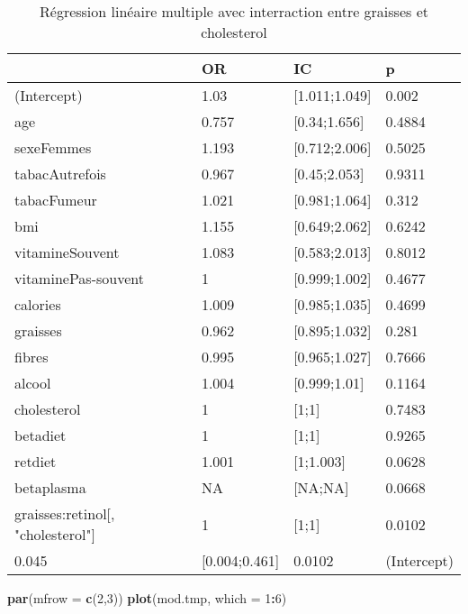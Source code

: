\documentclass[]{article}
\newenvironment{Shaded}{\begin{snugshade}}{\end{snugshade}}
\newcommand{\KeywordTok}[1]{\textcolor[rgb]{0.13,0.29,0.53}{\textbf{#1}}}
\newcommand{\DataTypeTok}[1]{\textcolor[rgb]{0.13,0.29,0.53}{#1}}
\newcommand{\DecValTok}[1]{\textcolor[rgb]{0.00,0.00,0.81}{#1}}
\newcommand{\OperatorTok}[1]{\textcolor[rgb]{0.81,0.36,0.00}{\textbf{#1}}}
\newcommand{\NormalTok}[1]{#1}
\begin{document}
\begin{table}

\caption{\label{tab:unnamed-chunk-89}Régression linéaire multiple avec interraction entre graisses et cholesterol}
\centering
\begin{tabular}[t]{l|l|l|l}
\hline
  & OR & IC & p\\
\hline
\rowcolor[HTML]{BBD2E1}  (Intercept) & 1.03 & [1.011;1.049] & 0.002\\
\hline
age & 0.757 & [0.34;1.656] & 0.4884\\
\hline
\rowcolor[HTML]{BBD2E1}  sexeFemmes & 1.193 & [0.712;2.006] & 0.5025\\
\hline
tabacAutrefois & 0.967 & [0.45;2.053] & 0.9311\\
\hline
\rowcolor[HTML]{BBD2E1}  tabacFumeur & 1.021 & [0.981;1.064] & 0.312\\
\hline
bmi & 1.155 & [0.649;2.062] & 0.6242\\
\hline
\rowcolor[HTML]{BBD2E1}  vitamineSouvent & 1.083 & [0.583;2.013] & 0.8012\\
\hline
vitaminePas-souvent & 1 & [0.999;1.002] & 0.4677\\
\hline
\rowcolor[HTML]{BBD2E1}  calories & 1.009 & [0.985;1.035] & 0.4699\\
\hline
graisses & 0.962 & [0.895;1.032] & 0.281\\
\hline
\rowcolor[HTML]{BBD2E1}  fibres & 0.995 & [0.965;1.027] & 0.7666\\
\hline
alcool & 1.004 & [0.999;1.01] & 0.1164\\
\hline
\rowcolor[HTML]{BBD2E1}  cholesterol & 1 & [1;1] & 0.7483\\
\hline
betadiet & 1 & [1;1] & 0.9265\\
\hline
\rowcolor[HTML]{BBD2E1}  retdiet & 1.001 & [1;1.003] & 0.0628\\
\hline
betaplasma & NA & [NA;NA] & 0.0668\\
\hline
\rowcolor[HTML]{BBD2E1}  graisses:retinol[, "cholesterol"] & 1 & [1;1] & 0.0102\\
\hline
0.045 & [0.004;0.461] & 0.0102 & (Intercept)\\
\hline
\end{tabular}
\end{table}

\begin{Shaded}
\begin{Highlighting}[]
\KeywordTok{par}\NormalTok{(}\DataTypeTok{mfrow =} \KeywordTok{c}\NormalTok{(}\DecValTok{2}\NormalTok{,}\DecValTok{3}\NormalTok{))}
\KeywordTok{plot}\NormalTok{(mod.tmp, }\DataTypeTok{which =} \DecValTok{1}\OperatorTok{:}\DecValTok{6}\NormalTok{)}
\end{Highlighting}
\end{Shaded}
\end{document}
